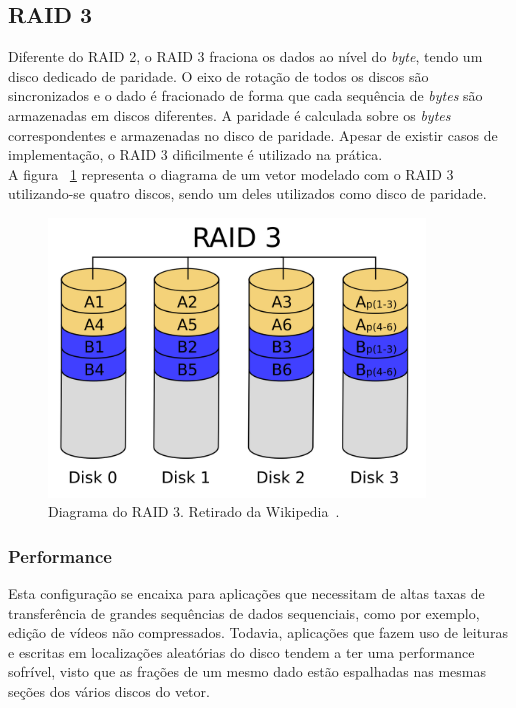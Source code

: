 	
		\subsection{RAID 3}
		
		Diferente do RAID 2, o RAID 3 fraciona os dados ao nível do \textit{byte}, tendo um disco dedicado de paridade. O eixo de rotação de todos os discos são sincronizados e o dado é fracionado de forma que cada sequência de \textit{bytes} são armazenadas em discos diferentes. A paridade é calculada sobre os \textit{bytes} correspondentes e armazenadas no disco de paridade. Apesar de existir casos de implementação, o RAID 3 dificilmente é utilizado na prática.\\
		
		A figura ~\ref{fig:raid3} representa o diagrama de um vetor modelado com o RAID 3 utilizando-se quatro discos, sendo um deles utilizados como disco de paridade.\\
		
		\begin{figure}[htb]
			\begin{center}
				
				\includegraphics[clip,width=10.0cm]{images/RAID_3.png}
				\caption{Diagrama do RAID 3. Retirado da Wikipedia~\citep{wikiRAIDlevels}.}
				\label{fig:raid3}
			\end{center}
		\end{figure} 
		
		\subsubsection{Performance}
		Esta configuração se encaixa para aplicações que necessitam de altas taxas de transferência de grandes sequências de dados sequenciais, como por exemplo, edição de vídeos não compressados. Todavia, aplicações que fazem uso de leituras e escritas em localizações aleatórias do disco tendem a ter uma performance sofrível, visto que as frações de um mesmo dado estão espalhadas nas mesmas seções dos vários discos do vetor.\\
		
